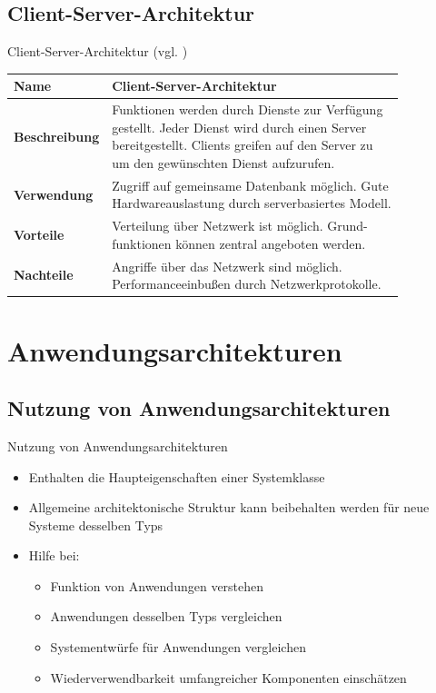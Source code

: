 \documentclass{beamer}
\begin{document}
			\subsection{Client-Server-Architektur}
			\begin{frame}{Client-Server-Architektur (vgl. \cite[ S. 198]{sommer})}
			\begin{tabular}{*{2}{l}}
				\toprule
				\textbf{Name}&\textbf{Client-Server-Architektur}\\
				\midrule\midrule
				\textbf{Beschreibung}&\makecell[l]{Funktionen werden durch Dienste zur Verfügung\\ gestellt. Jeder Dienst wird durch einen Server\\ bereitgestellt. Clients greifen auf den Server zu\\ um den gewünschten Dienst aufzurufen.}\\\midrule
				\textbf{Verwendung}&\makecell[l]{Zugriff auf gemeinsame Datenbank möglich. Gute\\ Hardwareauslastung durch serverbasiertes Modell.}\\\midrule
				\textbf{Vorteile}&\makecell[l]{Verteilung über Netzwerk ist möglich. Grund-\\funktionen können zentral angeboten werden.}\\\midrule
				\textbf{Nachteile}&\makecell[l]{Angriffe über das Netzwerk sind möglich.\\ Performanceeinbußen durch Netzwerkprotokolle.}\\
				\bottomrule
			\end{tabular}
			\end{frame}	
	\section{Anwendungsarchitekturen}
		\subsection{Nutzung von Anwendungsarchitekturen}
			\begin{frame}{Nutzung von Anwendungsarchitekturen}
				\begin{itemize}
					\item Enthalten die Haupteigenschaften einer Systemklasse
					\item Allgemeine architektonische Struktur kann beibehalten werden für neue Systeme desselben Typs
					\item Hilfe bei:
					\begin{itemize}
						\item Funktion von Anwendungen verstehen
						\item Anwendungen desselben Typs vergleichen
						\item Systementwürfe für Anwendungen vergleichen 
						\item Wiederverwendbarkeit umfangreicher Komponenten einschätzen
					\end{itemize}
				\end{itemize}
			\end{frame}
\end{document}
